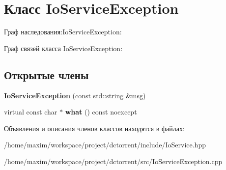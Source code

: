 \hypertarget{class_io_service_exception}{}\section{Класс Io\+Service\+Exception}
\label{class_io_service_exception}


Граф наследования\+:Io\+Service\+Exception\+:


Граф связей класса Io\+Service\+Exception\+:
\subsection*{Открытые члены}
\begin{DoxyCompactItemize}
\item 
\mbox{\label{class_io_service_exception_a0c6c309f815b3ee7ed3422d5b4ac0aa5}} 
{\bfseries Io\+Service\+Exception} (const std\+::string \&msg)
\item 
\mbox{\label{class_io_service_exception_a123f1a3f928da87f5268c936979f89e5}} 
virtual const char $\ast$ {\bfseries what} () const noexcept
\end{DoxyCompactItemize}


Объявления и описания членов классов находятся в файлах\+:\begin{DoxyCompactItemize}
\item 
/home/maxim/workspace/project/dctorrent/include/Io\+Service.\+hpp\item 
/home/maxim/workspace/project/dctorrent/src/Io\+Service\+Exception.\+cpp\end{DoxyCompactItemize}
